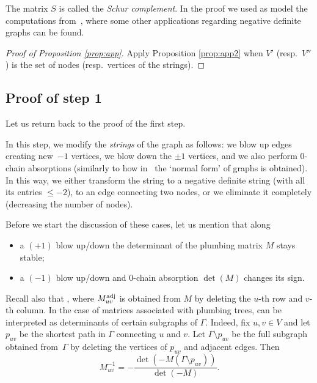\documentclass[pdftex]{sigma}
\begin{document}
The matrix $S$ is called the \emph{Schur complement}. In the proof we used as model the computations from~\cite[p.~526]{Nem22}, where some other applications regarding negative definite graphs can be found.

 \begin{proof}[Proof of Proposition \ref{prop:app}]
Apply Proposition \ref{prop:app2} when $V'$ (resp.\ $V''$) is the set of
 nodes (resp.\ vertices of the strings).
\end{proof}

\subsection{Proof of step 1}\label{ss:8.4}
Let us return back to the proof of the first step.

In this step, we modify the {\it strings}
of the graph as follows: we blow up edges creating new~$-1$ vertices,
we blow down the $\pm 1$ vertices, and we also perform 0-chain absorptions
(similarly to
how in~\cite[Theorem~4.1]{Neu81} the `normal form' of graphs is obtained).
In this way, we either transform the string to a negative definite
string (with all its entries $\leq -2$), to an edge connecting two nodes, or we eliminate it completely
(decreasing the number of nodes).

Before we start the discussion of these cases, let us mention that along
\begin{itemize}\itemsep=0pt
 \item a $(+1)$ blow up/down the determinant of the plumbing matrix $M$
stays stable;
 \item a $(-1)$ blow up/down and 0-chain absorption $\det(M)$ changes its sign.
\end{itemize}

Recall also that ,
where $M^{\rm adj}_{uv}$ is obtained from $M$ by deleting the $u$-th row and $v$-th column. In the case of matrices associated with plumbing trees,
 can be interpreted as determinants of certain subgraphs of $\Gamma$. Indeed,
fix $u,v\in V$ and let $p_{uv}$ be the shortest path in $\Gamma$ connecting $u$ and $v$. Let $\Gamma\setminus p_{uv}$ be the full subgraph obtained from~$\Gamma$ by deleting the vertices of $p_{uv}$ and adjacent edges.
Then
\begin{equation}\label{eq:app1}
M^{-1}_{uv}=-\frac{\det(-M(\Gamma\setminus p_{uv}))}{\det(-M)}.
\end{equation}
\end{document}
